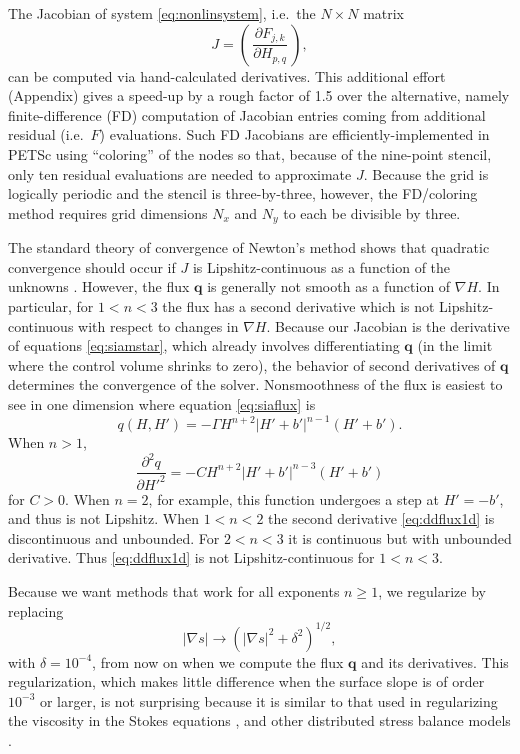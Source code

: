 \documentclass[twocolumn,letterpaper]{igs}
\newcommand\bq{\mathbf{q}}
\newcommand{\grad}{\nabla}
\begin{document}
The Jacobian of system \eqref{eq:nonlinsystem}, i.e.~the $N\times N$ matrix
\begin{equation}
J = \left(\,\frac{\partial F_{j,k}}{\partial H_{p,q}}\,\right), \label{eq:nonlinjacobian}
\end{equation}
can be computed via hand-calculated derivatives.  This additional effort (Appendix) gives a speed-up by a rough factor of 1.5 over the alternative, namely finite-difference (FD) computation of Jacobian entries coming from additional residual (i.e.~$F$) evaluations.  Such FD Jacobians are efficiently-implemented in PETSc using ``coloring'' of the nodes \citep{CurtisPowellReid1974} so that, because of the nine-point stencil, only ten residual evaluations are needed to approximate $J$.  Because the grid is logically periodic and the stencil is three-by-three, however, the FD/coloring method requires grid dimensions $N_x$ and $N_y$ to each be divisible by three.

The standard theory of convergence of Newton's method shows that quadratic convergence should occur if $J$ is Lipshitz-continuous as a function of the unknowns \citep[and references therein]{Kelley2003}.  However, the flux $\bq$ is generally not smooth as a function of $\grad H$.  In particular, for $1<n<3$ the flux has a second derivative which is not Lipshitz-continuous with respect to changes in $\grad H$.  Because our Jacobian is the derivative of equations \eqref{eq:siamstar}, which already involves differentiating $\bq$ (in the limit where the control volume shrinks to zero), the behavior of second derivatives of $\bq$ determines the convergence of the solver.  Nonsmoothness of the flux is easiest to see in one dimension where equation \eqref{eq:siaflux} is
\begin{equation}
q(H,H') = - \Gamma H^{n+2} \left|H'+b'\right|^{n-1} (H'+b'). \label{eq:flux1d}
\end{equation}
When $n>1$,
\begin{equation}
\frac{\partial^2 q}{\partial H'^2} = - C H^{n+2} \left|H'+b'\right|^{n-3} (H'+b') \label{eq:ddflux1d}
\end{equation}
for $C>0$.  When $n=2$, for example, this function undergoes a step at $H'=-b'$, and thus is not Lipshitz.  When $1< n < 2$ the second derivative \eqref{eq:ddflux1d} is discontinuous and unbounded.  For $2<n<3$ it is continuous but with unbounded derivative.  Thus \eqref{eq:ddflux1d} is not Lipshitz-continuous for $1<n<3$.

Because we want methods that work for all exponents $n\ge 1$, we regularize by replacing
\begin{equation}
|\grad s| \to \left(|\grad s|^2 + \delta^2\right)^{1/2}, \label{eq:nonlinregularization}
\end{equation}
with $\delta = 10^{-4}$, from now on when we compute the flux $\bq$ and its derivatives.  This regularization, which makes little difference when the surface slope is of order $10^{-3}$ or larger, is not surprising because it is similar to that used in regularizing the viscosity in the Stokes equations \citep{GreveBlatter2009}, and other distributed stress balance models \citep[for example]{BrownSmithAhmadia2013,BuelerBrown2009}.
\end{document}
